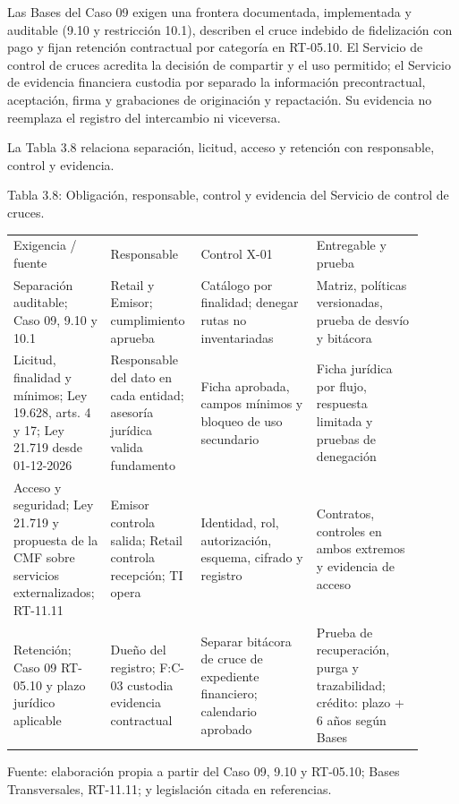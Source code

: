\documentclass[11pt]{article}
\begin{document}
{Las Bases del Caso 09 exigen una frontera documentada, implementada y auditable (9.10 y restricción 10.1), describen el cruce indebido de fidelización con pago y fijan retención contractual por categoría en RT-05.10. El Servicio de control de cruces acredita la decisión de compartir y el uso permitido; el Servicio de evidencia financiera custodia por separado la información precontractual, aceptación, firma y grabaciones de originación y repactación. Su evidencia no reemplaza el registro del intercambio ni viceversa.}

{La Tabla 3.8 relaciona separación, licitud, acceso y retención con responsable, control y evidencia.}

Tabla 3.8: Obligación, responsable, control y evidencia del Servicio de control de cruces.


\begin{longtable}{@{}p{0.19\linewidth}p{0.20\linewidth}p{0.27\linewidth}p{0.25\linewidth}@{}}
\toprule\noalign{}
\endhead
\bottomrule\noalign{}
\endlastfoot
{Exigencia / fuente} & {Responsable} & {Control X-01} & {Entregable y prueba} \\
{Separación auditable; Caso 09, 9.10 y 10.1} & {Retail y Emisor; cumplimiento aprueba} & {Catálogo por finalidad; denegar rutas no inventariadas} & {Matriz, políticas versionadas, prueba de desvío y bitácora} \\
{Licitud, finalidad y mínimos; Ley 19.628, arts. 4 y 17; Ley 21.719 desde 01-12-2026} & {Responsable del dato en cada entidad; asesoría jurídica valida fundamento} & {Ficha aprobada, campos mínimos y bloqueo de uso secundario} & {Ficha jurídica por flujo, respuesta limitada y pruebas de denegación} \\
{Acceso y seguridad; Ley 21.719 y propuesta de la CMF sobre servicios externalizados; RT-11.11} & {Emisor controla salida; Retail controla recepción; TI opera} & {Identidad, rol, autorización, esquema, cifrado y registro} & {Contratos, controles en ambos extremos y evidencia de acceso} \\
{Retención; Caso 09 RT-05.10 y plazo jurídico aplicable} & {Dueño del registro; F:C-03 custodia evidencia contractual} & {Separar bitácora de cruce de expediente financiero; calendario aprobado} & {Prueba de recuperación, purga y trazabilidad; crédito: plazo + 6 años según Bases} \\
\end{longtable}

{Fuente: elaboración propia a partir del Caso 09, 9.10 y RT-05.10; Bases Transversales, RT-11.11; y legislación citada en referencias.}
\end{document}
